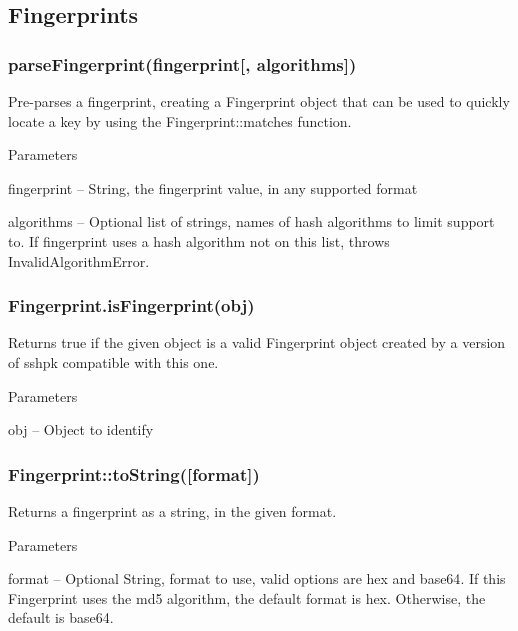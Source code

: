 \subsection*{Fingerprints}

\subsubsection*{{\ttfamily parse\+Fingerprint(fingerprint\mbox{[}, algorithms\mbox{]})}}

Pre-\/parses a fingerprint, creating a {\ttfamily Fingerprint} object that can be used to quickly locate a key by using the {\ttfamily Fingerprint\+::matches} function.

Parameters


\begin{DoxyItemize}
\item {\ttfamily fingerprint} -- String, the fingerprint value, in any supported format
\item {\ttfamily algorithms} -- Optional list of strings, names of hash algorithms to limit support to. If {\ttfamily fingerprint} uses a hash algorithm not on this list, throws {\ttfamily Invalid\+Algorithm\+Error}.
\end{DoxyItemize}

\subsubsection*{{\ttfamily Fingerprint.\+is\+Fingerprint(obj)}}

Returns {\ttfamily true} if the given object is a valid {\ttfamily Fingerprint} object created by a version of {\ttfamily sshpk} compatible with this one.

Parameters


\begin{DoxyItemize}
\item {\ttfamily obj} -- Object to identify
\end{DoxyItemize}

\subsubsection*{{\ttfamily Fingerprint\+::to\+String(\mbox{[}format\mbox{]})}}

Returns a fingerprint as a string, in the given format.

Parameters


\begin{DoxyItemize}
\item {\ttfamily format} -- Optional String, format to use, valid options are {\ttfamily hex} and {\ttfamily base64}. If this {\ttfamily Fingerprint} uses the {\ttfamily md5} algorithm, the default format is {\ttfamily hex}. Otherwise, the default is {\ttfamily base64}.
\end{DoxyItemize}

